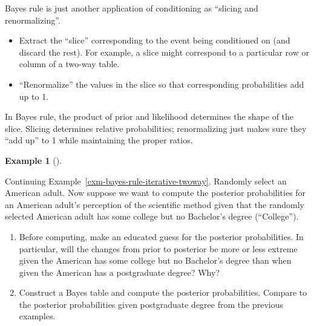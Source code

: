 \documentclass[
  letterpaper,
  DIV=11,
  numbers=noendperiod]{scrreprt}
\providecommand{\tightlist}{%
  \setlength{\itemsep}{0pt}\setlength{\parskip}{0pt}}
\theoremstyle{plain}
\theoremstyle{definition}
\newtheorem{example}{Example}[chapter]
\theoremstyle{definition}
\theoremstyle{definition}
\theoremstyle{remark}
\begin{document}
Bayes rule is just another application of conditioning as ``slicing and
renormalizing''.

\begin{itemize}
\tightlist
\item
  Extract the ``slice'' corresponding to the event being conditioned on
  (and discard the rest). For example, a slice might correspond to a
  particular row or column of a two-way table.\\
\item
  ``Renormalize'' the values in the slice so that corresponding
  probabilities add up to 1.
\end{itemize}

In Bayes rule, the product of prior and likelihood determines the shape
of the slice. Slicing determines relative probabilities; renormalizing
just makes sure they ``add up'' to 1 while maintaining the proper
ratios.

\begin{tcolorbox}[enhanced jigsaw, opacityback=0, left=2mm, colframe=quarto-callout-note-color-frame, toprule=.15mm, breakable, colback=white, leftrule=.75mm, arc=.35mm, rightrule=.15mm, bottomrule=.15mm]

\begin{example}[]\protect\hypertarget{exm-bayes-rule-iterative-bayestable2}{}\label{exm-bayes-rule-iterative-bayestable2}

Continuing Example~\ref{exm-bayes-rule-iterative-twoway}. Randomly
select an American adult. Now suppose we want to compute the posterior
probabilities for an American adult's perception of the scientific
method given that the randomly selected American adult has some college
but no Bachelor's degree (``College'').

\begin{enumerate}
\def\labelenumi{\arabic{enumi}.}
\tightlist
\item
  Before computing, make an educated guess for the posterior
  probabilities. In particular, will the changes from prior to posterior
  be more or less extreme given the American has some college but no
  Bachelor's degree than when given the American has a postgraduate
  degree? Why?
\item
  Construct a Bayes table and compute the posterior probabilities.
  Compare to the posterior probabilities given postgraduate degree from
  the previous examples.
\end{enumerate}

\end{example}

\end{tcolorbox}
\end{document}
